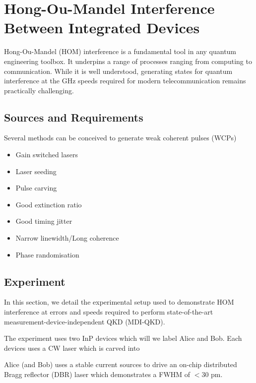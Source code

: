 %
%
\let\textcircled=\pgftextcircled
\chapter{Hong-Ou-Mandel Interference Between Integrated Devices}
\label{chap:hom}

Hong-Ou-Mandel (HOM) interference is a fundamental tool in any quantum engineering toolbox. It underpins a range of processes ranging from computing to communication. While it is well understood, generating states for quantum interference at the GHz speeds required for modern telecommunication remains practically challenging. 

\section{Sources and Requirements}
\label{sec:sources}

Several methods can be conceived to generate weak coherent pulses (WCPs)

\begin{itemize}
	\item Gain switched lasers
	\item Laser seeding
	\item Pulse carving
\end{itemize}

\begin{itemize}
	\item Good extinction ratio
	\item Good timing jitter
	\item Narrow linewidth/Long coherence
	\item Phase randomisation
\end{itemize}

\section{Experiment}

In this section, we detail the experimental setup used to demonstrate HOM interference at errors and speeds required to perform state-of-the-art measurement-device-independent QKD (MDI-QKD).

The experiment uses two InP devices which will we label Alice and Bob. Each devices uses a CW laser which is carved into  

Alice (and Bob) uses a stable current sources to drive an on-chip distributed Bragg reflector (DBR) laser which demonstrates a FWHM of $<30$ pm.

